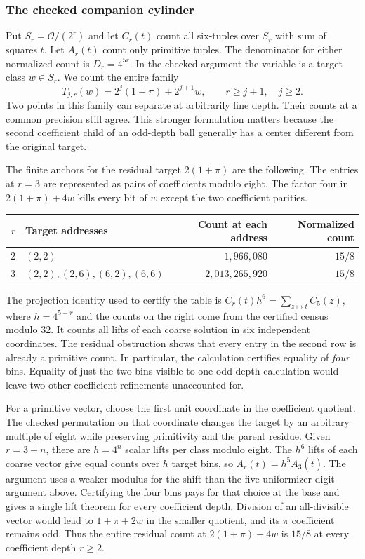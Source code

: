 \documentclass[12pt,letterpaper]{article}
\begin{document}
\subsubsection{The checked companion cylinder}

Put $S_r=\mathcal O/(2^r)$ and let $C_r(t)$ count all six-tuples over $S_r$ with sum of squares $t$. Let $A_r(t)$ count only primitive tuples. The denominator for either normalized count is $D_r=4^{5r}$. In the checked argument the variable is a target class $w\in S_r$. We count the entire family
\[
T_{j,r}(w)=2^j(1+\pi)+2^{j+1}w,
\qquad r\geq j+1,\quad j\geq2.
\]
Two points in this family can separate at arbitrarily fine depth. Their counts at a common precision still agree. This stronger formulation matters because the second coefficient child of an odd-depth ball generally has a center different from the original target.

The finite anchors for the residual target $2(1+\pi)$ are the following. The entries at $r=3$ are represented as pairs of coefficients modulo eight. The factor four in $2(1+\pi)+4w$ kills every bit of $w$ except the two coefficient parities.

\begin{center}
\begin{tabular}{@{}r l r r@{}}
\toprule
$r$ & Target addresses & Count at each address & Normalized count \\
\midrule
2 & $(2,2)$ & $1{,}966{,}080$ & $15/8$ \\
3 & $(2,2),(2,6),(6,2),(6,6)$ & $2{,}013{,}265{,}920$ & $15/8$ \\
\bottomrule
\end{tabular}
\end{center}

The projection identity used to certify the table is $C_r(t)h^6=\sum_{z\mapsto t}C_5(z)$, where $h=4^{5-r}$ and the counts on the right come from the certified census modulo $32$. It counts all lifts of each coarse solution in six independent coordinates. The residual obstruction shows that every entry in the second row is already a primitive count. In particular, the calculation certifies equality of \emph{four} bins. Equality of just the two bins visible to one odd-depth calculation would leave two other coefficient refinements unaccounted for.

For a primitive vector, choose the first unit coordinate in the coefficient quotient. The checked permutation on that coordinate changes the target by an arbitrary multiple of eight while preserving primitivity and the parent residue. Given $r=3+n$, there are $h=4^n$ scalar lifts per class modulo eight. The $h^6$ lifts of each coarse vector give equal counts over $h$ target bins, so $A_r(t)=h^5 A_3(\bar t)$. The argument uses a weaker modulus for the shift than the five-uniformizer-digit argument above. Certifying the four bins pays for that choice at the base and gives a single lift theorem for every coefficient depth. Division of an all-divisible vector would lead to $1+\pi+2w$ in the smaller quotient, and its $\pi$ coefficient remains odd. Thus the entire residual count at $2(1+\pi)+4w$ is $15/8$ at every coefficient depth $r\geq2$.
\end{document}
